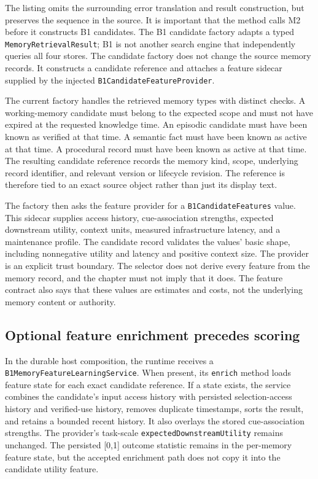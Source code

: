 The listing omits the surrounding error translation and result construction, but preserves the sequence in the source. It is important that the method calls M2 before it constructs B1 candidates. The B1 candidate factory adapts a typed \texttt{Memory\allowbreak{}Retrieval\allowbreak{}Result}; B1 is not another search engine that independently queries all four stores. The candidate factory does not change the source memory records. It constructs a candidate reference and attaches a feature sidecar supplied by the injected \texttt{B1\allowbreak{}Candidate\allowbreak{}Feature\allowbreak{}Provider}.

The current factory handles the retrieved memory types with distinct checks. A working-memory candidate must belong to the expected scope and must not have expired at the requested knowledge time. An episodic candidate must have been known as verified at that time. A semantic fact must have been known as active at that time. A procedural record must have been known as active at that time. The resulting candidate reference records the memory kind, scope, underlying record identifier, and relevant version or lifecycle revision. The reference is therefore tied to an exact source object rather than just its display text.

The factory then asks the feature provider for a \texttt{B1CandidateFeatures} value. This sidecar supplies access history, cue-association strengths, expected downstream utility, context units, measured infrastructure latency, and a maintenance profile. The candidate record validates the values' basic shape, including nonnegative utility and latency and positive context size. The provider is an explicit trust boundary. The selector does not derive every feature from the memory record, and the chapter must not imply that it does. The feature contract also says that these values are estimates and costs, not the underlying memory content or authority.

\subsection{Optional feature enrichment precedes scoring}
\label{subsec:ch21-b1-enrichment}

In the durable host composition, the runtime receives a \texttt{B1\allowbreak{}Memory\allowbreak{}Feature\allowbreak{}Learning\allowbreak{}Service}. When present, its \texttt{enrich} method loads feature state for each exact candidate reference. If a state exists, the service combines the candidate's input access history with persisted selection-access history and verified-use history, removes duplicate timestamps, sorts the result, and retains a bounded recent history. It also overlays the stored cue-association strengths. The provider's task-scale \texttt{expectedDownstreamUtility} remains unchanged. The persisted [0,1] outcome statistic remains in the per-memory feature state, but the accepted enrichment path does not copy it into the candidate utility feature.

